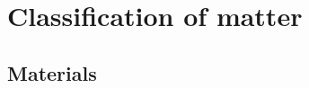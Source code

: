          \chapter{Classification of matter}\label{chap:classification}
    \setcounter{figure}{1}
    \setcounter{subfigure}{1}
    \label{m38708*cid1}
            \section{Materials}
            \nopagebreak

